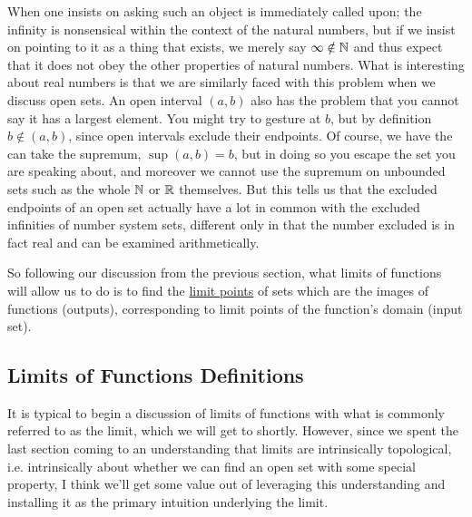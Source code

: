 \documentclass[11pt]{article}
\begin{document}
When one insists on asking  such an object is immediately called upon; the infinity is nonsensical within the context of the natural numbers, but if we insist on pointing to it as a thing that exists, we merely say $\infty \notin \mathbb{N}$ and thus expect that it does not obey the other properties of natural numbers. What is interesting about real numbers is that we are similarly faced with this problem when we discuss open sets. An open interval $(a,b)$ also has the problem that you cannot say it has a largest element. You might try to gesture at $b$, but by definition $b \notin (a,b)$, since open intervals exclude their endpoints. Of course, we have the can take the supremum, $\sup (a,b) = b$, but in doing so you escape the set you are speaking about, and moreover we cannot use the supremum on unbounded sets such as the whole $\mathbb{N}$ or $\mathbb{R}$ themselves. But this tells us that the excluded endpoints of an open set actually have a lot in common with the excluded infinities of number system sets, different only in that the number excluded is in fact real and can be examined arithmetically.

So following our discussion from the previous section, what limits of functions will allow us to do is to find the \hyperref[pro:ClosedSetsClosedUnderLimitsR]{limit points} of sets which are the images of functions (outputs), corresponding to limit points of the function's domain (input set).

\subsection{Limits of Functions Definitions}

It is typical to begin a discussion of limits of functions with what is commonly referred to as the  limit, which we will get to shortly. However, since we spent the last section coming to an understanding that limits are intrinsically topological, i.e. intrinsically about whether we can find an open set with some special property, I think we'll get some value out of leveraging this understanding and installing it as the primary intuition underlying the limit.
\end{document}

